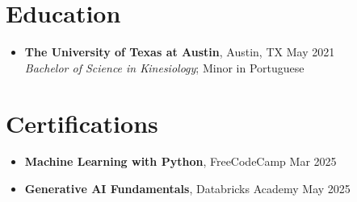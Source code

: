 \documentclass[letterpaper,10pt]{article}
\newcommand{\resumeItem}[1]{\item \small{#1}}
\begin{document}
\section*{Education}
\begin{itemize}
  \resumeItem{\textbf{The University of Texas at Austin}, Austin, TX \hfill May 2021 \\ \textit{Bachelor of Science in Kinesiology}; Minor in Portuguese}
\end{itemize}

\section*{Certifications}
\begin{itemize}
  \resumeItem{\textbf{Machine Learning with Python}, FreeCodeCamp \hfill Mar 2025}
  \resumeItem{\textbf{Generative AI Fundamentals}, Databricks Academy \hfill May 2025}
\end{itemize}
\end{document}
